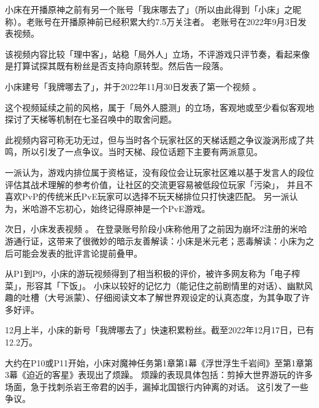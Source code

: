 \begin{multicols}{2}


	小床在开播原神之前有另一个账号「我床哪去了」（所以由此得到「小床」之昵称）。老账号在开播原神前已经积累大约7.5万关注者。
	老账号在2022年9月3日发表视频\href{https://www.bilibili.com/video/BV12e4y1Y71p}{}。

	该视频内容比较「理中客」，站稳「局外人」立场，不评游戏只评节奏，看起来像是打算试探其既有粉丝是否支持向原转型。然后告一段落。

	小床建号「我牌哪去了」，并于2022年11月30日发表了第一个视频%
	\href{https://www.bilibili.com/video/BV1XG411M7Nh}{}。

	这个视频延续之前的风格，属于「局外人臆测」的立场，客观地或至少看似客观地探讨了天梯等机制在七圣召唤中的取舍问题。

	此视频内容可称无功无过，但与当时各个玩家社区的天梯话题之争议漩涡形成了共鸣，所以引发了一点争议。当时天梯、段位话题下主要有两派意见。

	一派认为，游戏内排位属于资格证，没有段位会让玩家社区难以基于发言人的段位评估其战术理解的参考价值，让社区的交流更容易被低段位玩家「污染」，
	并且不喜欢PvP的传统米氏PvE玩家可以选择不玩天梯排位只打快速匹配。
	另一派认为，米哈游不忘初心，始终记得原神是一个PvE游戏。

	次日，小床发表视频%
	\href{https://www.bilibili.com/video/BV1zG4y197cG}{}。
	在登录账号阶段小床称他用了之前因为崩坏2注册的米哈游通行证，这带来了很微妙的暗示\pozhehao{}友善解读：小床是米元老；恶毒解读：小床为之后可能会发表的批评言论提前叠甲。

	从P1到P9，小床的游玩视频得到了相当积极的评价，被许多网友称为「电子榨菜」，形容其「下饭」。
	小床以较好的记忆力（能记住之前剧情里的对话）、幽默风趣的吐槽（大号派蒙）、仔细阅读文本了解世界观设定的认真态度，为其争取了许多好评。

	12月上半，小床的新号「我牌哪去了」快速积累粉丝。截至2022年12月17日，已有12.2万。


	大约在P10或P11开始，小床对魔神任务第1章第1幕《浮世浮生千岩间》至第1章第3幕《迫近的客星》表现出了烦躁。
	烦躁的表现具体包括：剪掉大世界游玩的许多场面，急于找刺杀岩王帝君的凶手，漏掉北国银行内钟离的对话。
	这引发了一些争议。


\end{multicols}
